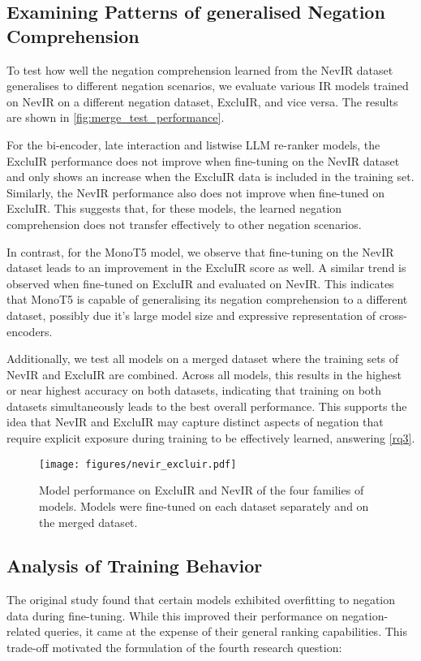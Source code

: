 \subsection{Examining Patterns of generalised Negation Comprehension}
To test how well the negation comprehension learned from the NevIR dataset generalises to different negation scenarios, we evaluate various IR models trained on NevIR on a different negation dataset, ExcluIR, and vice versa. The results are shown in \autoref{fig:merge_test_performance}. 

For the bi-encoder, late interaction and listwise LLM re-ranker models, the ExcluIR performance does not improve when fine-tuning on the NevIR dataset and only shows an increase when the ExcluIR data is included in the training set. Similarly, the NevIR performance also does not improve when fine-tuned on ExcluIR. This suggests that, for these models, the learned negation comprehension does not transfer effectively to other negation scenarios. 

In contrast, for the MonoT5 model, we observe that fine-tuning on the NevIR dataset leads to an improvement in the ExcluIR score as well. A similar trend is observed when fine-tuned on ExcluIR and evaluated on NevIR. This indicates that MonoT5 is capable of generalising its negation comprehension to a different dataset, possibly due it's large model size and expressive representation of cross-encoders.

Additionally, we test all models on a merged dataset where the training sets of NevIR and ExcluIR are combined. Across all models, this results in the highest or near highest accuracy on both datasets, indicating that training on both datasets simultaneously leads to the best overall performance. This supports the idea that NevIR and ExcluIR may capture distinct aspects of negation that require explicit exposure during training to be effectively learned, answering \ref{rq3}.

\begin{figure}[t!bp]

  \centering
  \texttt{[image: figures/nevir\_excluir.pdf]}
  \caption{Model performance on ExcluIR and NevIR of the four families of models. Models were fine-tuned on each dataset separately and on the merged dataset.}
   \label{fig:merge_test_performance}
\end{figure}

\subsection{Analysis of Training Behavior}
The original study found that certain models exhibited overfitting to negation data during fine-tuning. While this improved their performance on negation-related queries, it came at the expense of their general ranking capabilities. This trade-off motivated the formulation of the fourth research question:

